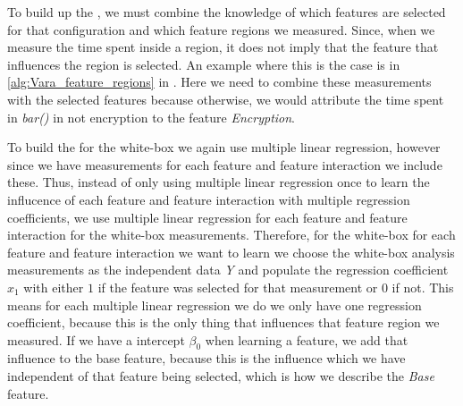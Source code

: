 To build up the {\perfInfluenceModel}, we must combine the knowledge of which features are selected for that configuration and which 
feature regions we measured. Since, when we measure the time spent inside a region, 
it does not imply that the feature that influences the region is selected. 
An example where this is the case is in \autoref{alg:Vara_feature_regions} in .
Here we need to combine these measurements with the selected features because otherwise,
we would attribute the time spent in \emph{bar()} in not encryption to the feature \emph{Encryption}.

To build the {\perfInfluenceModel} for the white-box we again use multiple linear regression, however since we have measurements for each 
feature and feature interaction we include these. Thus, instead of only using multiple linear regression once to learn the influcence of each feature
and feature interaction with multiple regression coefficients, we use multiple linear regression for each feature and feature interaction for the 
white-box measurements. Therefore, for the white-box for each feature and feature interaction we want to learn we choose the 
white-box analysis measurements as the independent data \emph{Y} and populate the regression coefficient $x_1$ with either $1$ 
if the feature was selected for that measurement or $0$ if not. This means for each multiple linear regression we do we only have
one regression coefficient, because this is the only thing that influences that feature region we measured. 
If we have a intercept $\beta_0$ when learning a feature, we add that influence to the base feature, because this is the influence which
we have independent of that feature being selected, which is how we describe the \emph{Base} feature.

